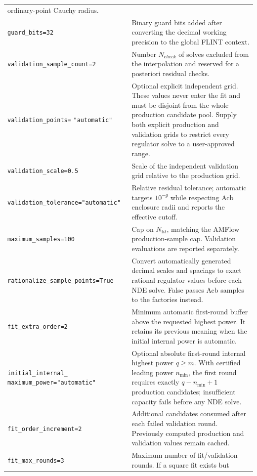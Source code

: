\documentclass[11pt]{article}
\begin{document}
\begin{longtable}{L{0.36\textwidth}L{0.58\textwidth}}
ordinary-point Cauchy radius. \\
\texttt{guard\_bits=32} & Binary guard bits added after converting the decimal working
precision to the global FLINT context. \\
\texttt{validation\_sample\_count=2} & Number $N_{\mathrm check}$ of solves excluded from the
interpolation and reserved for a posteriori residual checks. \\
\texttt{validation\_points=}
\newline\texttt{"automatic"} & Optional explicit independent grid.  These values never enter
the fit and must be disjoint from the whole production candidate pool.  Supply both explicit
production and validation grids to restrict every regulator solve to a user-approved range. \\
\texttt{validation\_scale=0.5} & Scale of the independent validation grid relative to the
production grid. \\
\texttt{validation\_tolerance=}\newline\texttt{"automatic"} & Relative residual tolerance; automatic targets
$10^{-g}$ while respecting Acb enclosure radii and reports the effective cutoff. \\
\texttt{maximum\_samples=100} & Cap on $N_{\mathrm fit}$, matching the AMFlow production-sample
cap.  Validation evaluations are reported separately. \\
\texttt{rationalize\_sample\_points=True} & Convert automatically generated decimal scales
and spacings to exact rational regulator values before each NDE solve.  False passes Acb
samples to the factories instead. \\
\texttt{fit\_extra\_order=2} & Minimum automatic first-round buffer above the requested highest
power.  It retains its previous meaning when the initial internal power is automatic. \\
\texttt{initial\_internal\_}
\newline\texttt{maximum\_power="automatic"} & Optional absolute first-round internal highest
power $q\ge m$.  With certified leading power $n_{\min}$, the first round requires exactly
$q-n_{\min}+1$ production candidates; insufficient capacity fails before any NDE solve. \\
\texttt{fit\_order\_increment=2} & Additional candidates consumed after each failed validation
round.  Previously computed production and validation values remain cached. \\
\texttt{fit\_max\_rounds=3} & Maximum number of fit/validation rounds.  If a square fit exists but

\end{longtable}
\end{document}
